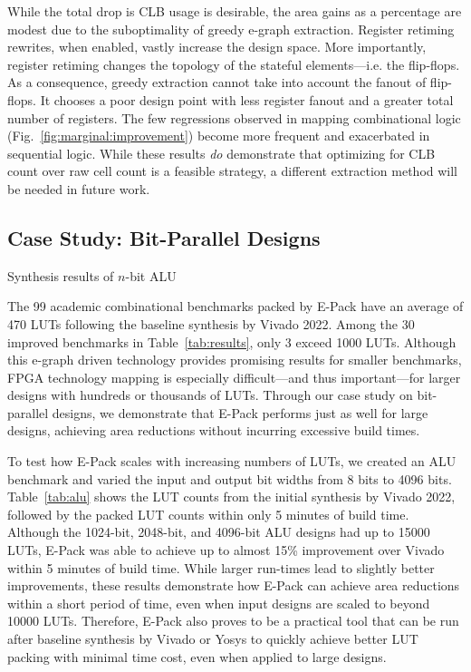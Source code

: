 While the total drop is CLB usage is desirable, the area gains as a percentage
are modest due to the suboptimality of greedy e-graph extraction. Register
retiming rewrites, when enabled, vastly increase the design space. More
importantly, register retiming changes the topology of the stateful
elements---i.e. the flip-flops. As a consequence, greedy extraction cannot take
into account the fanout of flip-flops. It chooses a poor design point with less
register fanout and a greater total number of registers. The few regressions
observed in mapping combinational logic (Fig.~\ref{fig:marginal:improvement})
become more frequent and exacerbated in sequential logic. While these results
\textit{do} demonstrate that optimizing for CLB count over raw cell count is a
feasible strategy, a different extraction method will be needed in future work.

\subsection{Case Study: Bit-Parallel Designs}\label{sec:results:scalability}
\begin{table}
    \centering
    \caption{Synthesis results of $n$-bit ALU}\label{tab:alu}
\end{table}
The 99 academic combinational benchmarks packed by E-Pack have an average of 470 LUTs following the baseline synthesis by Vivado 2022. Among the 30 improved benchmarks in Table~\ref{tab:results}, only 3 exceed 1000 LUTs. Although this e-graph driven technology provides promising results for smaller benchmarks, FPGA technology mapping is especially difficult—and thus important—for larger designs with hundreds or thousands of LUTs. Through our case study on bit-parallel designs, we demonstrate that E-Pack performs just as well for large designs, achieving area reductions without incurring excessive build times.

To test how E-Pack scales with increasing numbers of LUTs, we created an ALU benchmark and varied the input and output bit widths from 8 bits to 4096 bits. Table~\ref{tab:alu} shows the LUT counts from the initial synthesis by Vivado 2022, followed by the packed LUT counts within only 5 minutes of build time. Although the 1024-bit, 2048-bit, and 4096-bit ALU designs had up to 15000 LUTs, E-Pack was able to achieve up to almost 15\% improvement over Vivado within 5 minutes of build time. While larger run-times lead to slightly better improvements, these results demonstrate how E-Pack can achieve area reductions within a short period of time, even when input designs are scaled to beyond 10000 LUTs. Therefore, E-Pack also proves to be a practical tool that can be run after baseline synthesis by Vivado or Yosys to quickly achieve better LUT packing with minimal time cost, even when applied to large designs.
